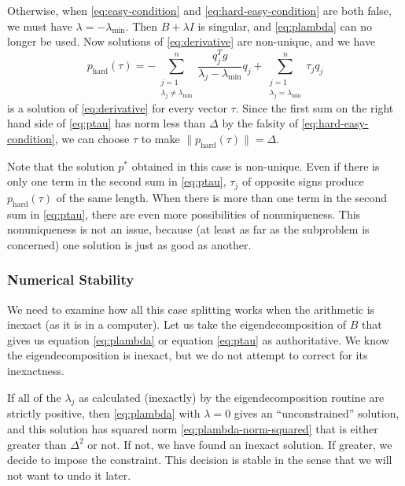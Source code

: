 \documentclass[11pt]{article}
\begin{document}
Otherwise, when \eqref{eq:easy-condition} and \eqref{eq:hard-easy-condition}
are both false,
we must have $\lambda = - \lambda_{\text{min}}$.
Then $B + \lambda I$ is singular, and \eqref{eq:plambda}
can no longer be used.  Now solutions of \eqref{eq:derivative}
are non-unique, and we have
\begin{equation} \label{eq:ptau}
   p_{\text{hard}}(\tau)
   =
   - \sum_{\substack{j = 1 \\ \lambda_j \neq \lambda_{\text{min}}}}^n
   \frac{q_j^T g}{\lambda_j - \lambda_{\text{min}}} q_j
   +
   \sum_{\substack{j = 1 \\ \lambda_j = \lambda_{\text{min}}}}^n
   \tau_j q_j
\end{equation}
is a solution of \eqref{eq:derivative} for every vector $\tau$.
Since the first sum on the right hand side of \eqref{eq:ptau} has
norm less than $\Delta$ by the falsity of \eqref{eq:hard-easy-condition},
we can choose $\tau$ to make $\lVert p_{\text{hard}}(\tau) \rVert = \Delta$.

Note that the solution $p^*$ obtained in this case is non-unique.
Even if there is only one term in the second sum in \eqref{eq:ptau},
$\tau_j$ of opposite signs produce $p_{\text{hard}}(\tau)$ of the same
length.
When there is more than one term in the second sum in \eqref{eq:ptau},
there are even more possibilities of nonuniqueness.
This nonuniqueness is not an issue, because (at least as far as the subproblem
is concerned) one solution is just as good as another.

\subsubsection{Numerical Stability}

We need to examine how all this case splitting works when the
arithmetic is inexact (as it is in a computer).  Let us take
the eigendecomposition of $B$ that gives us equation \eqref{eq:plambda}
or equation \eqref{eq:ptau}
as authoritative.  We know the eigendecomposition is inexact,
but we do not attempt to
correct for its inexactness.

If all of the $\lambda_j$ as calculated (inexactly) by the eigendecomposition
routine are strictly positive, then \eqref{eq:plambda} with $\lambda = 0$
gives an ``unconstrained'' solution, and this solution has squared norm
\eqref{eq:plambda-norm-squared} that
is either greater than $\Delta^2$ or not.  If not, we have found an inexact
solution.  If greater, we decide to impose the constraint.
This decision is stable in the sense that we will not want to undo it later.
\end{document}
